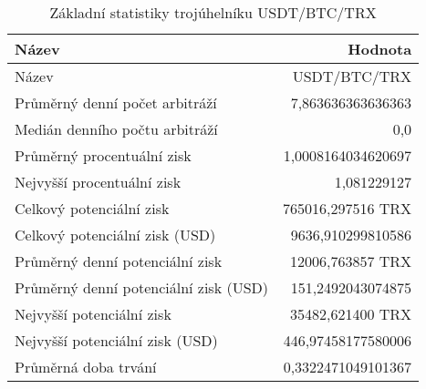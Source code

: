 \begin{table}\centering
\caption{Základní statistiky trojúhelníku USDT/BTC/TRX}
\label{USDTBTCTRX_stats}
\begin{tabular}{|| l | r ||}
\hline Název & Hodnota \\ 
\hline\hline Název & USDT/BTC/TRX \\ 
\hline Průměrný denní počet arbitráží & 7,863636363636363 \\ 
\hline Medián denního počtu arbitráží & 0,0 \\ 
\hline Průměrný procentuální zisk & 1,0008164034620697 \\ 
\hline Nejvyšší procentuální zisk & 1,081229127 \\ 
\hline Celkový potenciální zisk & 765016,297516 TRX \\ 
\hline Celkový potenciální zisk (USD) & 9636,910299810586 \\ 
\hline Průměrný denní potenciální zisk & 12006,763857 TRX \\ 
\hline Průměrný denní potenciální zisk (USD) & 151,2492043074875 \\ 
\hline Nejvyšší potenciální zisk & 35482,621400 TRX \\ 
\hline Nejvyšší potenciální zisk (USD) & 446,97458177580006 \\ 
\hline Průměrná doba trvání & 0,3322471049101367 \\ 
\hline
\end{tabular}
\end{table}